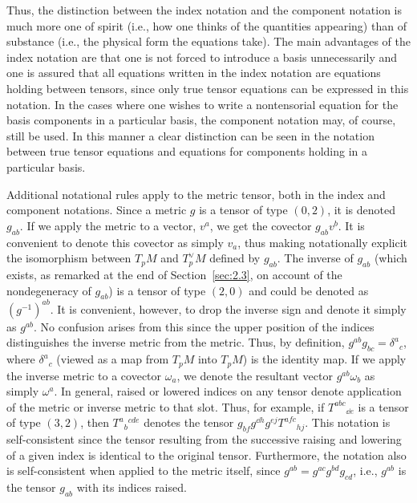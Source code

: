 Thus, the distinction between the index notation and the component notation is much
more one of spirit (i.e., how one thinks of the quantities appearing) than of
substance (i.e., the physical form the equations take).  The main advantages of the
index notation are that one is not forced to introduce a basis unnecessarily and one
is assured that all equations written in the index notation are equations holding
between tensors, since only true tensor equations can be expressed in this notation.
In the cases where one wishes to write a nontensorial equation for the basis
components in a particular basis, the component notation may, of course, still be
used.  In this manner a clear distinction can be seen in the notation between true
tensor equations and equations for components holding in a particular basis.

Additional notational rules apply to the metric tensor, both in the index and
component notations.  Since a metric \(g\) is a tensor of type \((0,2)\), it is
denoted \(g_{ab}\).  If we apply the metric to a vector, \(v^a\), we get the
covector \(g_{ab}v^b\).  It is convenient to denote this covector as simply
\(v_a\), thus making notationally explicit the isomorphism between \(T_pM\) and
\(T_p^\vee M\) defined by \(g_{ab}\).  The inverse of \(g_{ab}\) (which exists, as
remarked at the end of Section~\ref{sec:2.3}, on account of the nondegeneracy of
\(g_{ab}\)) is a tensor of type \((2,0)\) and could be denoted as
\((g^{-1})^{ab}\).  It is convenient, however, to drop the inverse sign and denote
it simply as \(g^{ab}\).  No confusion arises from this since the upper position of
the indices distinguishes the inverse metric from the metric.  Thus, by definition,
\(g^{ab}g_{bc}=\delta^a{}_c\), where \(\delta^a{}_c\) (viewed as a map from
\(T_pM\) into \(T_pM\)) is the identity map.  If we apply the inverse metric to a
covector \(\omega_a\), we denote the resultant vector \(g^{ab}\omega_b\) as
simply \(\omega^a\).  In general, raised or lowered indices on any tensor denote
application of the metric or inverse metric to that slot.  Thus, for example, if
\(T^{abc}{}_{\dd e}\) is a tensor of type \((3,2)\), then \(T^a{}_b{}^{cde}\) denotes
the tensor \(g_{bf}g^{\dd h}g^{ej}T^{afc}{}_{hj}\).  This notation is self-consistent
since the tensor resulting from the successive raising and lowering of a given index
is identical to the original tensor.  Furthermore, the notation also is
self-consistent when applied to the metric itself, since
\(g^{ab}=g^{ac}g^{bd}g_{cd}\), i.e., \(g^{ab}\) is the tensor \(g_{ab}\) with its
indices raised.

